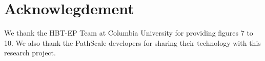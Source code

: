 \section{Acknowlegdement}

We thank the HBT-EP Team at Columbia University for providing figures
7 to 10.
We also thank the PathScale developers for sharing their technology with
this research project.